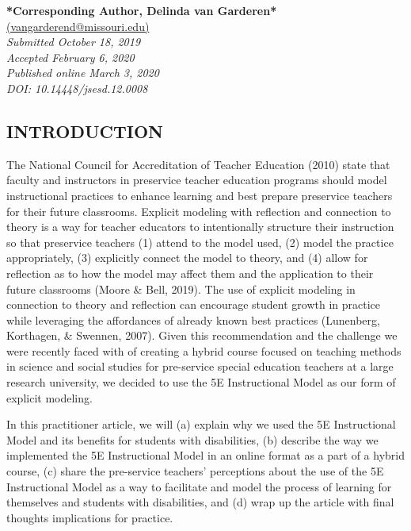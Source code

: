 \documentclass[11.5pt]{sig-alternate} %
\begin{document}
\textbf{*Corresponding Author, Delinda van Garderen*}\\
\href{mailto: vangarderend@missouri.edu}{(vangarderend@missouri.edu)} \\
\textit{Submitted  October 18, 2019}\\
\textit{Accepted February 6, 2020} \\
\textit{Published online March 3, 2020} \\
\textit{DOI: 10.14448/jsesd.12.0008} \\
\pagebreak
\clearpage
\begin{large}

\section*{INTRODUCTION}

The National Council for Accreditation of Teacher Education (2010) state that faculty and instructors in preservice teacher education programs should model instructional practices to enhance learning and best prepare preservice teachers for their future classrooms.  Explicit modeling with reflection and connection to theory is a way for teacher educators to intentionally structure their instruction so that preservice teachers (1) attend to the model used, (2) model the practice appropriately, (3) explicitly connect the model to theory, and (4) allow for reflection as to how the model may affect them and the application to their future classrooms (Moore \& Bell, 2019).  The use of explicit modeling in connection to theory and reflection can encourage student growth in practice while leveraging the affordances of already known best practices (Lunenberg, Korthagen, \& Swennen, 2007).  Given this recommendation and the challenge we were recently faced with of creating a hybrid course focused on teaching methods in science and social studies for pre-service special education teachers at a large research university, we decided to use the 5E Instructional Model as our form of explicit modeling. 

In this practitioner article, we will (a) explain why we used the 5E Instructional Model and its benefits for students with disabilities, (b) describe the way we implemented the 5E Instructional Model in an online format as a part of a hybrid course, (c) share the pre-service teachers’ perceptions about the use of the 5E Instructional Model as a way to facilitate and model the process of learning for themselves and students with disabilities, and (d) wrap up the article with final thoughts implications for practice. 


\end{large}
\end{document}
